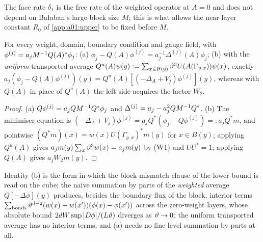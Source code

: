 The face rate $\delta_1$ is the free rate of the weighted operator at $A=0$ and does not depend on Ba{\l}aban's large-block size $M$; this is what allows the near-layer constant $R_0$ of \cref{app:a01:upper} to be fixed before $M$.

\begin{lemma}\label{lem:a01:EF}
\label{lem:a01:EB}
For every weight, domain, boundary condition and gauge field, with $\phi^{(j)}=a_jM^{-1}Q(A)^*\phi_j$: (a) $\phi_j-Q(A)\phi^{(j)}=a_j^{-1}\Delta^{(j)}(A)\phi_j$; (b) with the \emph{uniform} transported average $Q^u(A)\psi(y):=\sum_{x\in B(y)}\vartheta^3U(A(\Gamma_{y,x}))\psi(x)$, exactly $a_j(\phi_j-Q(A)\phi^{(j)})(y)=Q^u(A)[(-\Delta_A+V_j)\phi^{(j)}](y)$, whereas with $Q(A)$ in place of $Q^u(A)$ the left side acquires the factor $W_2$.
\end{lemma}
\begin{proof}
(a) $Q\phi^{(j)}=a_jQM^{-1}Q^*\phi_j$ and $\Delta^{(j)}=a_j-a_j^2QM^{-1}Q^*$. (b) The minimiser equation is $(-\Delta_A+V_j)\phi^{(j)}=a_jQ^*(\phi_j-Q\phi^{(j)})=:a_jQ^*m$, and pointwise $(Q^*m)(x)=w(x)U(\Gamma_{y,x})^*m(y)$ for $x\in B(y)$; applying $Q^u(A)$ gives $a_jm(y)\sum_x\vartheta^3w(x)=a_jm(y)$ by (W1) and $UU^*=1$; applying $Q(A)$ gives $a_jW_2m(y)$.
\end{proof}

Identity (b) is the form in which the block-mismatch clause of the lower bound is read on the cube; the naive summation by parts of the \emph{weighted} average $Q[-\Delta\phi](y)$ produces, besides the boundary flux of the block, interior terms $\sum_{\text{bonds}}\vartheta^{d-2}(w(x)-w(x'))(\phi(x)-\phi(x'))$ across the zero-weight layers, whose absolute bound $2dW\sup|D\phi|/(L\vartheta)$ diverges as $\vartheta\to0$; the uniform transported average has no interior terms, and (a) needs no fine-level summation by parts at all.
